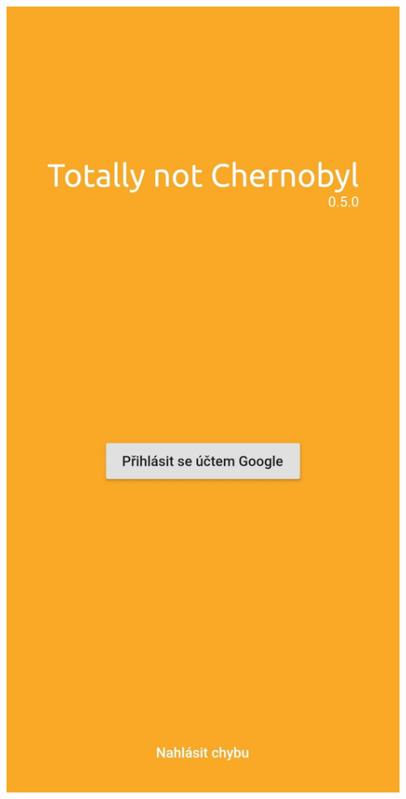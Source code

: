 \documentclass[czech,aspectratio=169]{beamer}
\begin{document}
  \begin{frame}
    \begin{columns}
      \begin{column}{.25\textwidth}
        \begin{center}
          \includegraphics[width=.9\textwidth]{assets/slides/screen-a1}
        \end{center}
      \end{column}
      \begin{column}{.25\textwidth}

\end{column}
\end{columns}
\end{frame}
\end{document}
